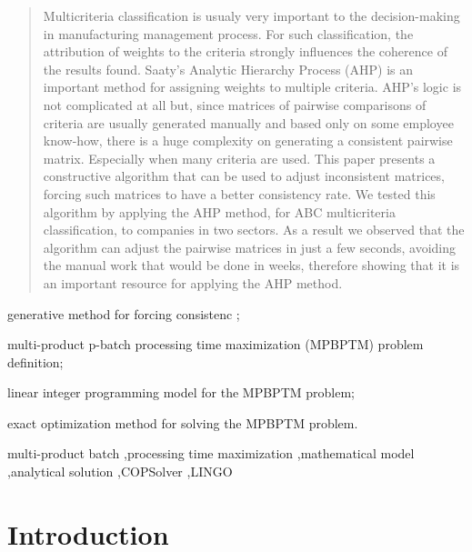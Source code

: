 \documentclass[authoryear,manuscript,12pt]{elsarticle}
\begin{document}
\begin{frontmatter}
\begin{abstract} 
Multicriteria classification is usualy very important to the decision-making in manufacturing management process. For such classification, the attribution of weights to the criteria strongly influences the coherence of the results found. Saaty's Analytic Hierarchy Process (AHP) is an important method for assigning weights to multiple criteria.  AHP's logic is not complicated at all but, since matrices of pairwise comparisons of criteria  are usually generated manually and based only on some employee know-how, there is a huge complexity on generating a consistent pairwise matrix. Especially when many criteria are used. This paper presents a constructive algorithm that can be used to adjust inconsistent matrices, forcing such matrices to have a better consistency rate. We tested this algorithm by applying the AHP method, for ABC multicriteria classification, to companies in two sectors. As a result we observed that the algorithm can adjust the pairwise matrices in just a few seconds, avoiding the manual work that would be done in weeks, therefore showing that it is an important resource for applying the AHP method. 
\end{abstract}

\begin{highlights}
\item generative method for forcing consistenc ;
\item multi-product p-batch processing time maximization (MPBPTM) problem definition;
\item linear integer programming model for the MPBPTM problem;
\item exact optimization method for solving the MPBPTM problem.
\end{highlights}

\begin{keyword}
multi-product batch \sep processing time maximization \sep mathematical model \sep analytical solution \sep COPSolver \sep LINGO
\end{keyword}
\end{frontmatter}


\section{Introduction}
\label{sec:intro}
\end{document}
